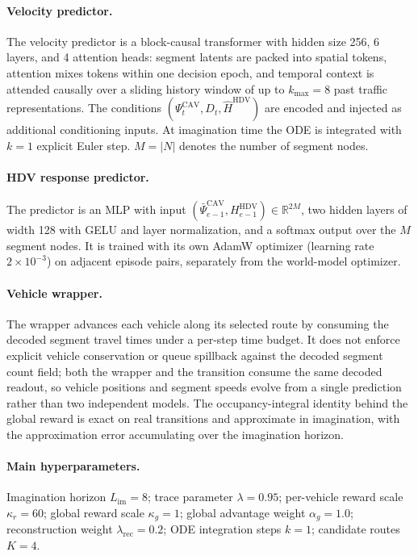 \paragraph{Velocity predictor.}  The velocity predictor is a block-causal
transformer with hidden size 256, 6 layers, and 4 attention heads: segment
latents are packed into spatial tokens, attention mixes tokens within one
decision epoch, and temporal context is attended causally over a sliding
history window of up to \(k_{\max}=8\) past traffic representations.  The
conditions \((\Psi_t^{\mathrm{CAV}},D_t,\hat H^{\mathrm{HDV}})\) are
encoded and injected as additional conditioning inputs.  At imagination time
the ODE is integrated with \(k=1\) explicit Euler step.  \(M=|N|\) denotes the
number of segment nodes.

\paragraph{HDV response predictor.}  The predictor is an MLP with input
\((\bar\Psi_{e-1}^{\mathrm{CAV}},H_{e-1}^{\mathrm{HDV}})\in\mathbb{R}^{2M}\),
two hidden layers of width 128 with GELU and layer normalization, and a softmax
output over the \(M\) segment nodes.  It is trained with its own AdamW optimizer
(learning rate \(2\times10^{-3}\)) on adjacent episode pairs, separately from
the world-model optimizer.

\paragraph{Vehicle wrapper.}  The wrapper advances each vehicle along its
selected route by consuming the decoded segment travel times under a per-step
time budget.  It does not enforce explicit vehicle conservation or queue
spillback against the decoded segment count field; both the wrapper and the
transition consume the same decoded readout, so vehicle positions and segment
speeds evolve from a single prediction rather than two independent models.
The occupancy-integral identity behind the global reward is exact on real
transitions and approximate in imagination, with the approximation error
accumulating over the imagination horizon.

\paragraph{Main hyperparameters.}  Imagination horizon \(L_{\mathrm{im}}=8\);
trace parameter \(\lambda=0.95\); per-vehicle reward scale \(\kappa_r=60\);
global reward scale \(\kappa_g=1\); global advantage weight \(\alpha_g=1.0\);
reconstruction weight \(\lambda_{\mathrm{rec}}=0.2\); ODE integration steps
\(k=1\); candidate routes \(K=4\).

